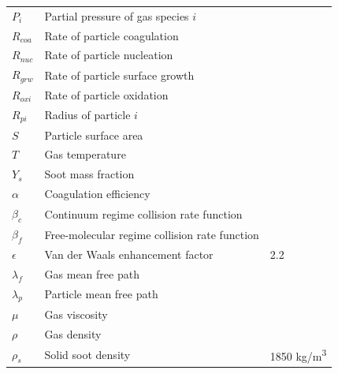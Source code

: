 \documentclass[preprint,letterpaper]{elsarticle}
\begin{document}
{\begin{tabularx}{\textwidth}{l >{\raggedright\arraybackslash}X l}
    $P_{i}$         & Partial pressure of gas species $i$       & \\    %
    $R_{coa}$       & Rate of particle coagulation              & \\    %
    $R_{nuc}$       & Rate of particle nucleation               & \\    %
    $R_{grw}$       & Rate of particle surface growth           & \\    %
    $R_{oxi}$       & Rate of particle oxidation                & \\    %
    $R_{pi}$        & Radius of particle $i$                    & \\    %
    $S$             & Particle surface area                     & \\    %
    $T$             & Gas temperature                           & \\    %
    $Y_s$           & Soot mass fraction                        & \\    %
    $\alpha$             & Coagulation efficiency                    & \\
    $\beta_{c}$         & Continuum regime collision rate function      &  \\ %
    $\beta_{f}$         & Free-molecular regime collision rate function &  \\ %
    $\epsilon$             & Van der Waals enhancement factor          & 2.2 \\
    $\lambda_f$           & Gas mean free path                        &  \\ %
    $\lambda_p$           & Particle mean free path                   &  \\ %
    $\mu$             & Gas viscosity                             &  \\ %
    $\rho$             & Gas density                               &   \\ %
    $\rho_s$           & Solid soot density                        & 1850 \si{kg/m^3}  \\
    \hline
\end{tabularx}

}
\end{document}
